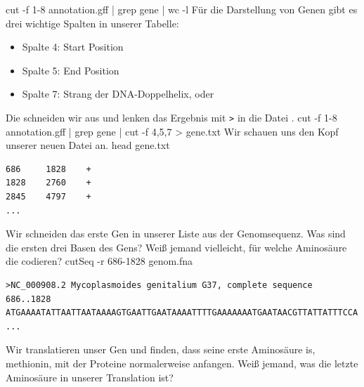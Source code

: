 cut -f 1-8 annotation.gff |
    grep gene |
    wc -l 
\nwendcode{}\nwdocspar
Für die Darstellung von Genen gibt es drei wichtige Spalten in unserer
Tabelle:
\begin{itemize}
\item Spalte 4: Start Position
\item Spalte 5: End Position
\item Spalte 7: Strang der DNA-Doppelhelix, \ty{+} oder \ty{-}
\end{itemize}
Die schneiden wir aus und lenken das Ergebnis mit \verb+>+ in die
Datei .
\nwenddocs{}\plusendmoddef\nwstartdeflinemarkup{}\nwenddeflinemarkup
cut -f 1-8 annotation.gff |
    grep gene |
    cut -f 4,5,7 > gene.txt
\nwendcode{}\nwdocspar
Wir schauen uns den Kopf unserer neuen Datei  an.
\nwenddocs{}\plusendmoddef\nwstartdeflinemarkup{}\nwenddeflinemarkup
head gene.txt
\nwendcode{}\nwdocspar
\begin{verbatim}
686     1828    +
1828    2760    +
2845    4797    +
...
\end{verbatim}
Wir schneiden das erste Gen in unserer Liste aus der Genomsequenz. Was
sind die ersten drei Basen des Gens? Weiß jemand vielleicht, für
welche Aminosäure die codieren?
\nwenddocs{}\plusendmoddef\nwstartdeflinemarkup{}\nwenddeflinemarkup
cutSeq -r 686-1828 genom.fna
\nwendcode{}\nwdocspar
\begin{verbatim}
>NC_000908.2 Mycoplasmoides genitalium G37, complete sequence 686..1828
ATGAAAATATTAATTAATAAAAGTGAATTGAATAAAATTTTGAAAAAAATGAATAACGTTATTATTTCCA
...
\end{verbatim}
Wir translatieren unser Gen und finden, dass seine erste Aminosäure
 is, methionin, mit der Proteine normalerweise anfangen. Weiß
jemand, was die letzte Aminosäure in unserer Translation ist?
\nwenddocs{}\plusendmoddef\nwstartdeflinemarkup{}\nwenddeflinemarkup

